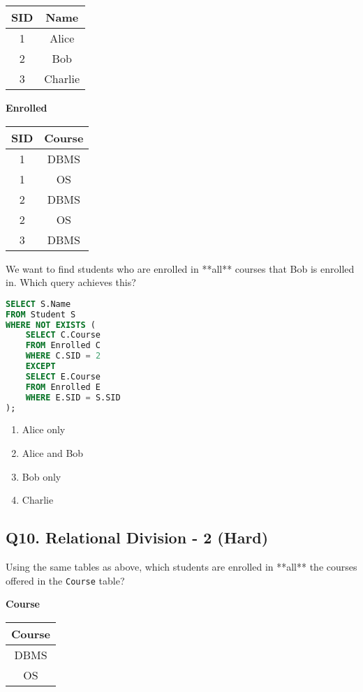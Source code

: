 \begin{tabular}{|c|c|}
\hline
\textbf{SID} & \textbf{Name} \\
\hline
1 & Alice \\
2 & Bob \\
3 & Charlie \\
\hline
\end{tabular}

\textbf{Enrolled}

\begin{tabular}{|c|c|}
\hline
\textbf{SID} & \textbf{Course} \\
\hline
1 & DBMS \\
1 & OS \\
2 & DBMS \\
2 & OS \\
3 & DBMS \\
\hline
\end{tabular}

We want to find students who are enrolled in **all** courses that Bob is enrolled in. Which query achieves this?

\begin{lstlisting}[language=SQL]
SELECT S.Name 
FROM Student S
WHERE NOT EXISTS (
    SELECT C.Course
    FROM Enrolled C
    WHERE C.SID = 2
    EXCEPT
    SELECT E.Course
    FROM Enrolled E
    WHERE E.SID = S.SID
);
\end{lstlisting}

\begin{enumerate}[label=(\alph*)]
    \item Alice only
    \item Alice and Bob
    \item Bob only
    \item Charlie
\end{enumerate}

\subsection*{Q10. Relational Division - 2 (Hard)}
Using the same tables as above, which students are enrolled in **all** the courses offered in the \texttt{Course} table?

\textbf{Course}

\begin{tabular}{|c|}
\hline
\textbf{Course} \\
\hline
DBMS \\
OS \\
\hline
\end{tabular}

